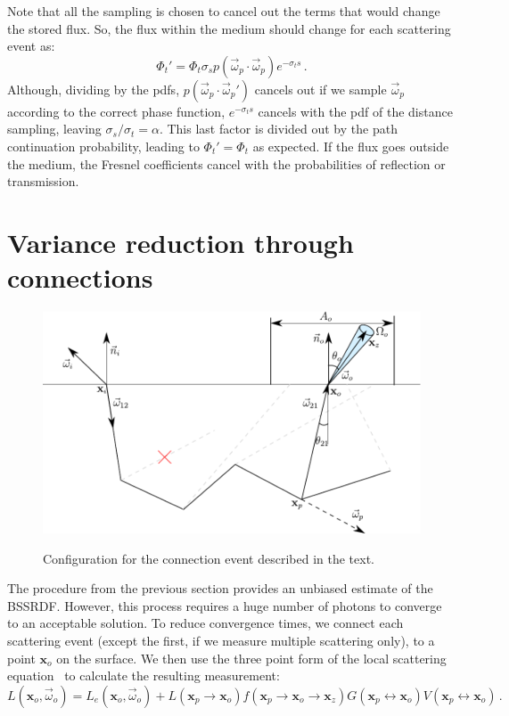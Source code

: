 \documentclass[10pt,a4paper]{article}
\newcommand{\x}{\mathbf{x}}
\newcommand{\vomega}{\vec{\omega}}
\begin{document}
Note that all the sampling is chosen to cancel out the terms that would change the stored flux. So, the flux within the medium should change for each scattering event as:
%
\[
\Phi_t' = \Phi_t \sigma_s p(\vomega_p \cdot \vomega_p) e^{-\sigma_t s} \, .
\]
%
Although, dividing by the pdfs, $p(\vomega_p \cdot \vomega_p')$ cancels out if we sample $\vomega_p$ according to the correct phase function, $e^{-\sigma_t s}$ cancels with the pdf of the distance sampling, leaving $\sigma_s/\sigma_t = \alpha$. This last factor is divided out by the path continuation probability, leading to $\Phi_t' = \Phi_t$ as expected. If the flux goes outside the medium, the Fresnel coefficients cancel with the probabilities of reflection or transmission.



\section{Variance reduction through connections}

\begin{figure}[h]

\includegraphics[scale=0.7]{configuration.pdf}\\[-4ex]

\caption{Configuration for the connection event described in the text.}
\label{fig:diagram}

\end{figure}



\noindent The procedure from the previous section provides an unbiased estimate of the BSSRDF. However, this process requires a huge number of photons to converge to an acceptable solution. To reduce convergence times, we connect each scattering event (except the first, if we measure multiple scattering only), to a point $\x_o$ on the surface. We then use the three point form of the local scattering equation~\cite{raab08} to calculate the resulting measurement:
%
\[
L(\x_o, \vomega_o) =  L_e(\x_o, \vomega_o) + L(\x_p \rightarrow \x_o) f(\x_p \rightarrow \x_o \rightarrow \x_z) G(\x_p \leftrightarrow \x_o) V(\x_p \leftrightarrow \x_o) \, .
\]
\end{document}

